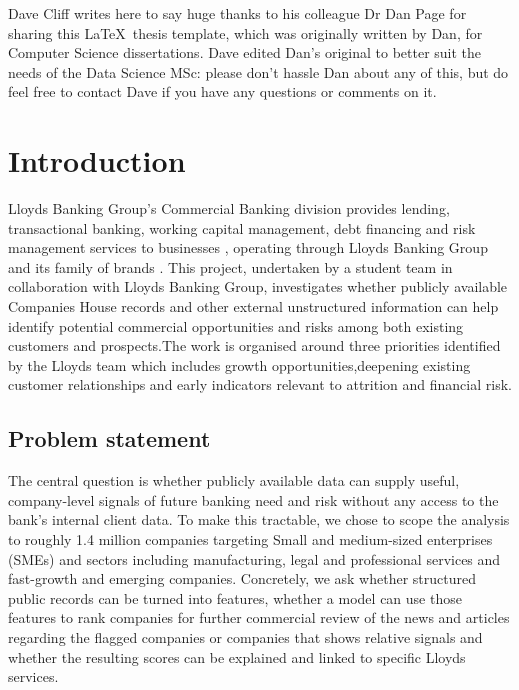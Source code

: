 \documentclass[ %
                    author={Daniel Page},
                supervisor={Dr. Andrew Calway},
                    degree={MSc},
                     title={Some Structural Guidelines for Data Science MSc Theses, Including Those With Long Titles that Run Across Multiple Lines on the Front Page},
                  subtitle={And those including an optional subtitle too, for good measure},
                      type={},
                      year={2021}]{dissertation}
\begin{document}
\vspace{1cm}
Dave Cliff writes here to say huge thanks to his colleague Dr Dan Page for sharing this \LaTeX\ thesis template, which was originally written by Dan, for Computer Science dissertations. Dave edited Dan's original to better suit the needs of the Data Science MSc: please don't hassle Dan about any of this, but do feel free to contact Dave if you have any questions or comments on it.  


%

\mainmatter
\chapter{Introduction}
\label{chap:introduction}

Lloyds Banking Group's Commercial Banking division provides lending, transactional banking, working capital management, debt financing and risk management services to businesses \cite{lloyds_products}, operating through Lloyds Banking Group and its family of brands \cite{lbg_brands}. This project, undertaken by a student team in collaboration with Lloyds Banking Group, investigates whether publicly available Companies House records and other external unstructured information can help identify potential commercial opportunities and risks among both existing customers and prospects.The work is organised around three priorities identified by the Lloyds team which includes growth opportunities,deepening existing customer relationships and early indicators relevant to attrition and financial risk.

\section{Problem statement}
The central question is whether publicly available data can supply useful, company-level signals of future banking need and risk without any access to the bank's internal client data. To make this tractable, we chose to scope the analysis to roughly 1.4 million companies targeting Small and medium-sized enterprises (SMEs) and sectors including manufacturing, legal and professional services and fast-growth and emerging companies. Concretely, we ask whether structured public records can be turned into features, whether a model can use those features to rank companies for further commercial review of the news and articles regarding the flagged companies or companies that shows relative signals and whether the resulting scores can be explained and linked to specific Lloyds services.
\end{document}
